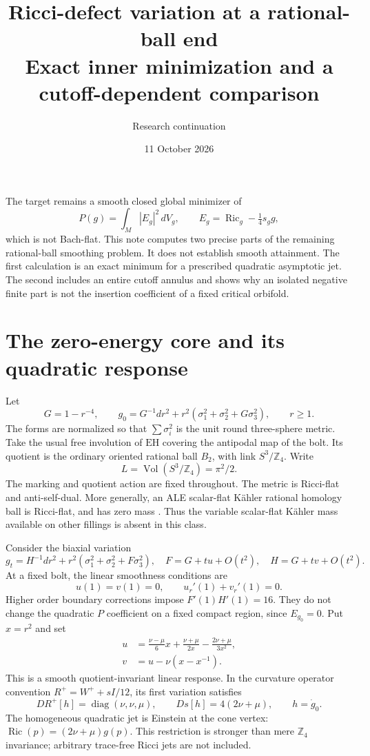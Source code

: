 \documentclass[11pt]{article}
\title{Ricci-defect variation at a rational-ball end\\\large Exact inner minimization and a cutoff-dependent comparison}
\author{Research continuation}
\date{11 October 2026}
\newcommand{\Ric}{\operatorname{Ric}}
\newcommand{\Vol}{\operatorname{Vol}}
\newcommand{\dd}{\,d}
\newcommand{\EH}{\mathrm{EH}}
\begin{document}
\maketitle
\noindent
The target remains a smooth closed global minimizer of
\[
 P(g)=\int_M|E_g|^2\dd V_g,\qquad E_g=\Ric_g-\tfrac14s_g g,
\]
which is not Bach-flat. This note computes two precise parts of the remaining
rational-ball smoothing problem. It does not establish smooth attainment.
The first calculation is an exact minimum for a prescribed quadratic
asymptotic jet. The second includes an entire cutoff annulus and shows why
an isolated negative finite part is not the insertion coefficient of a fixed
critical orbifold.

\section{The zero-energy core and its quadratic response}
Let
\[
 G=1-r^{-4},\qquad
 g_0=G^{-1}dr^2+r^2(\sigma_1^2+\sigma_2^2+G\sigma_3^2),\qquad r\ge1.
\]
The forms are normalized so that $\sum\sigma_i^2$ is the unit round
three-sphere metric. Take the usual free involution of $\EH$ covering the
antipodal map of the bolt. Its quotient is the ordinary oriented rational
ball $B_2$, with link $S^3/\mathbb Z_4$. Write
\[
 L=\Vol(S^3/\mathbb Z_4)=\pi^2/2.
\]
The marking and quotient action are fixed throughout. The metric is
Ricci-flat and anti-self-dual. More generally, an ALE scalar-flat K\"ahler
rational homology ball is Ricci-flat, and has zero mass
\cite{Wright,HeinLeBrun}. Thus the variable scalar-flat K\"ahler mass available
on other fillings is absent in this class.

Consider the biaxial variation
\[
 g_t=H^{-1}dr^2+r^2(\sigma_1^2+\sigma_2^2+F\sigma_3^2),\quad
 F=G+tu+O(t^2),\quad H=G+tv+O(t^2).
\]
At a fixed bolt, the linear smoothness conditions are
\[
 u(1)=v(1)=0,\qquad u_r'(1)+v_r'(1)=0.
\]
Higher order boundary corrections impose $F'(1)H'(1)=16$. They do not
change the quadratic $P$ coefficient on a fixed compact region, since
$E_{g_0}=0$. Put $x=r^2$ and set
\begin{align}
 u&=\frac{\nu-\mu}{6}x+\frac{\nu+\mu}{2x}
               -\frac{2\nu+\mu}{3x^2},\label{response}\\
 v&=u-\nu(x-x^{-1}).\nonumber
\end{align}
This is a smooth quotient-invariant linear response. In the curvature
operator convention $R^+=W^++sI/12$, its first variation satisfies
\[
 DR^+[h]=\operatorname{diag}(\nu,\nu,\mu),\qquad
 Ds[h]=4(2\nu+\mu),\qquad h=\dot g_0.
\]
The homogeneous quadratic jet is Einstein at the cone vertex:
$\Ric(p)=(2\nu+\mu)g(p)$. This restriction is stronger than mere
$\mathbb Z_4$ invariance; arbitrary trace-free Ricci jets are not included.
\end{document}
